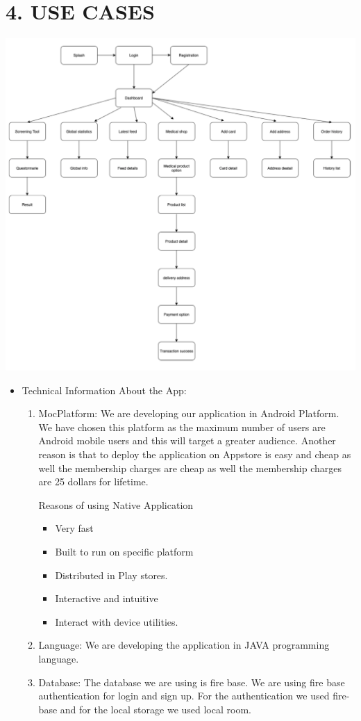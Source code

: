 \section * {\LARGE 4. USE CASES}
\begin{center}
\includegraphics[scale=0.75]{use case.png}\\[0.75cm]
\end{center}
\begin{itemize}
    \item Technical Information About the App:

\begin{enumerate}
    \item MocPlatform: We are developing our application in Android Platform. We have chosen this platform as the maximum number of users are Android mobile users and this will target a greater audience. Another reason is that to deploy the application on Appstore is easy and cheap as well the membership charges are cheap as well the membership charges are 25 dollars for lifetime.

    Reasons of using Native Application 
    \begin{itemize}
    \item Very fast
    \item Built to run on specific platform 
    \item Distributed in Play stores. 
    \item Interactive and intuitive
    \item Interact with device utilities.
\end{itemize}
\item Language: We are developing the application in JAVA programming language.
\item Database: The database we are using is fire base. We are using fire base authentication for login and sign up. For the authentication we used fire- base and for the local storage we used local room.
\end{enumerate}
\end{itemize}


